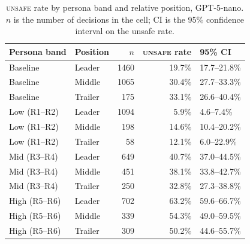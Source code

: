 \documentclass[sigconf]{aamas}
\newcommand{\Unsafe}{\textsc{unsafe}}
\begin{document}
\begin{table}[t]
    \caption{\Unsafe{} rate by persona band and relative position,
    GPT-5-nano. $n$ is the number of decisions in the cell; CI is the
    95\% confidence interval on the unsafe rate.}
    \label{tab:position-gpt5nano}
    \centering
    \small
    \begin{tabular}{@{}llrrl@{}}
        \toprule
        Persona band & Position & $n$ & \Unsafe{} rate & 95\% CI \\
        \midrule
        Baseline      & Leader  & 1460 & 19.7\% & 17.7--21.8\% \\
        Baseline      & Middle  & 1065 & 30.4\% & 27.7--33.3\% \\
        Baseline      & Trailer & 175  & 33.1\% & 26.6--40.4\% \\
        Low (R1--R2)  & Leader  & 1094 & 5.9\%  & 4.6--7.4\%   \\
        Low (R1--R2)  & Middle  & 198  & 14.6\% & 10.4--20.2\% \\
        Low (R1--R2)  & Trailer & 58   & 12.1\% & 6.0--22.9\%  \\
        Mid (R3--R4)  & Leader  & 649  & 40.7\% & 37.0--44.5\% \\
        Mid (R3--R4)  & Middle  & 451  & 38.1\% & 33.8--42.7\% \\
        Mid (R3--R4)  & Trailer & 250  & 32.8\% & 27.3--38.8\% \\
        High (R5--R6) & Leader  & 702  & 63.2\% & 59.6--66.7\% \\
        High (R5--R6) & Middle  & 339  & 54.3\% & 49.0--59.5\% \\
        High (R5--R6) & Trailer & 309  & 50.2\% & 44.6--55.7\% \\
        \bottomrule
    \end{tabular}
\end{table}
\end{document}
